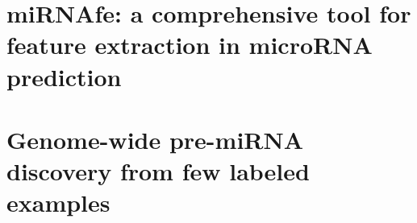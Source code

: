 \begin{appendices}
	\chapter{miRNAfe: a comprehensive tool for feature extraction in microRNA prediction}
	\label{sec:mirnafe}
	\blankpage
	
	

	\blankpage
	\chapter{Genome-wide pre-miRNA discovery from few labeled examples}
	\label{sec:mirnass}
	\blankpage
	
	
\end{appendices}
